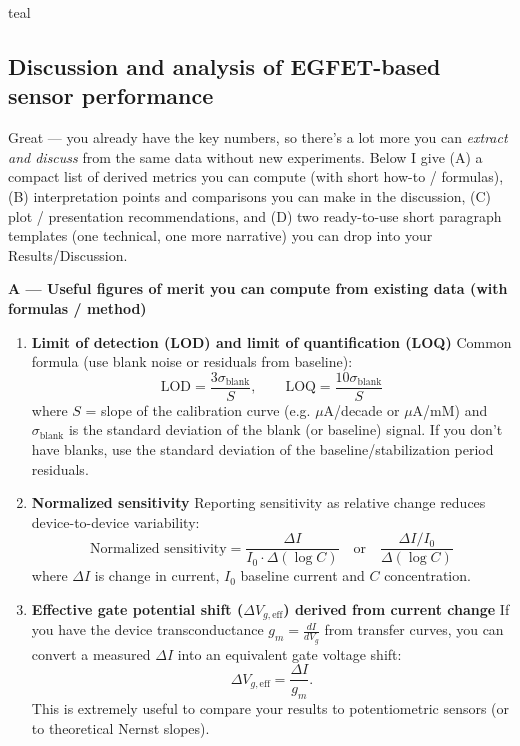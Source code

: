 \begin{color}{teal}
    \subsection*{Discussion and analysis of EGFET-based sensor performance}

Great — you already have the key numbers, so there’s a lot more you can \textit{extract and discuss} from the same data without new experiments. Below I give (A) a compact list of derived metrics you can compute (with short how-to / formulas), (B) interpretation points and comparisons you can make in the discussion, (C) plot / presentation recommendations, and (D) two ready-to-use short paragraph templates (one technical, one more narrative) you can drop into your Results/Discussion.

\bigskip

\noindent\textbf{A — Useful figures of merit you can compute from existing data (with formulas / method)}
\begin{enumerate}
    \item \textbf{Limit of detection (LOD) and limit of quantification (LOQ)}  
    Common formula (use blank noise or residuals from baseline):
    \[
    \text{LOD}=\frac{3\sigma_\text{blank}}{S},\qquad
    \text{LOQ}=\frac{10\sigma_\text{blank}}{S}
    \]
    where \(S\) = slope of the calibration curve (e.g. \(\mu\)A/decade or \(\mu\)A/mM) and \(\sigma_\text{blank}\) is the standard deviation of the blank (or baseline) signal. If you don’t have blanks, use the standard deviation of the baseline/stabilization period residuals.

    \item \textbf{Normalized sensitivity}  
    Reporting sensitivity as relative change reduces device-to-device variability:
    \[
    \text{Normalized sensitivity} = \frac{\Delta I}{I_0\cdot \Delta(\log C)} \quad\text{or}\quad \frac{\Delta I/I_0}{\Delta(\log C)}
    \]
    where \(\Delta I\) is change in current, \(I_0\) baseline current and \(C\) concentration.

    \item \textbf{Effective gate potential shift (\(\Delta V_{g,\text{eff}}\)) derived from current change}  
    If you have the device transconductance \(g_m=\frac{dI}{dV_g}\) from transfer curves, you can convert a measured \(\Delta I\) into an equivalent gate voltage shift:
    \[
    \Delta V_{g,\text{eff}}=\frac{\Delta I}{g_m}.
    \]
    This is extremely useful to compare your results to potentiometric sensors (or to theoretical Nernst slopes).


\end{enumerate}
\end{color}
